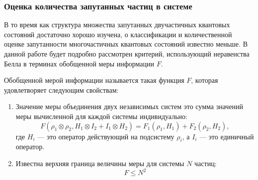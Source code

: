 



\subsubsection{Оценка количества запутанных частиц в системе}
В то время как структура множества запутанных двучастичных квантовых состояний достаточно хорошо изучена,
о классификации и количественной оценке запутанности многочастичных квантовых состояний известно меньше\cite{Plenio2007, Amico2008, Horodecki2009, Guhne2009}.
%
В данной работе будет подробно рассмотрен критерий,
использующий  неравенства Белла\cite{Bell1964} в терминах обобщенной меры информации $F$.

\begin{definition}\label{def:f}
Обобщенной мерой информации называется такая функция $F$,
которая удовлетворяет следующим свойствам:
\begin{enumerate}
  \item Значение меры объединения двух независимых систем это сумма значений меры вычисленной для каждой системы индивидуально:
  \begin{equation}\label{eq:f-additive-map}
    F(\rho_1 \otimes \rho_2 ,H_1 \otimes I_2 + I_1 \otimes H_2)
    = F_{1} (\rho_1, H_1) + F_{2} (\rho_2 , H_2),
  \end{equation}
  где $H_i$ --- это оператор действующий на подсистему $\rho_i$,
  а $I_i$ --- это единичный оператор.

  \item Известна верхняя граница величины меры для системы $N$ частиц:
  \begin{equation}\label{eq:f-supremum}
    F \leq N^2
  \end{equation}
\end{enumerate}
\end{definition}


